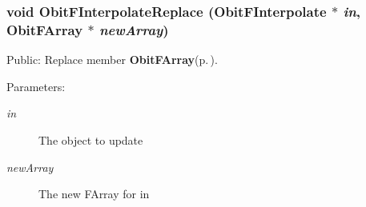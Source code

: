 \subsubsection{\setlength{\rightskip}{0pt plus 5cm}void Obit\-FInterpolate\-Replace ({\bf Obit\-FInterpolate} $\ast$ {\em in}, {\bf Obit\-FArray} $\ast$ {\em new\-Array})}\label{ObitFInterpolate_8c_a12}


Public: Replace member {\bf Obit\-FArray}{\rm (p.\,\pageref{structObitFArray})}. 

\begin{Desc}
\item[Parameters:]
\begin{description}
\item[{\em in}]The object to update \item[{\em new\-Array}]The new FArray for in \end{description}
\end{Desc}
